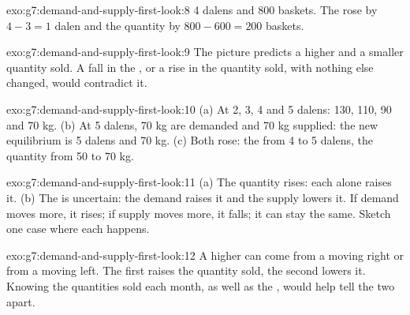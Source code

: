 \begin{solution}{exo:g7:demand-and-supply-first-look:8}
4 dalens and 800 baskets. The  rose by $4 - 3 = 1$ dalen and the quantity by
$800 - 600 = 200$ baskets.
\end{solution}

\begin{solution}{exo:g7:demand-and-supply-first-look:9}
The picture predicts a higher  and a smaller quantity sold. A fall in the , or a
rise in the quantity sold, with nothing else changed, would contradict it.
\end{solution}

\begin{solution}{exo:g7:demand-and-supply-first-look:10}
(a) At 2, 3, 4 and 5 dalens: 130, 110, 90 and 70 kg. (b) At 5 dalens, 70 kg are demanded and
70 kg supplied: the new equilibrium is 5 dalens and 70 kg. (c) Both rose: the  from 4 to
5 dalens, the quantity from 50 to 70 kg.
\end{solution}

\begin{solution}{exo:g7:demand-and-supply-first-look:11}
(a) The quantity rises: each  alone raises it. (b) The  is uncertain: the demand
 raises it and the supply  lowers it. If demand moves more, it rises; if supply
moves more, it falls; it can stay the same. Sketch one case where each happens.
\end{solution}

\begin{solution}{exo:g7:demand-and-supply-first-look:12}
A higher  can come from a  moving right or from a  moving left.
The first raises the quantity sold, the second lowers it. Knowing the quantities sold each
month, as well as the , would help tell the two apart.
\end{solution}

